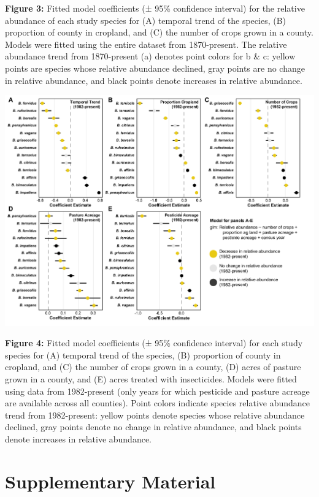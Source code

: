 \documentclass[11pt,]{article}
\begin{document}
\textbf{Figure 3:} Fitted model coefficients (± 95\% confidence
interval) for the relative abundance of each study species for (A)
temporal trend of the species, (B) proportion of county in cropland, and
(C) the number of crops grown in a county. Models were fitted using the
entire dataset from 1870-present. The relative abundance trend from
1870-present (a) denotes point colors for b \& c: yellow points are
species whose relative abundance declined, gray points are no change in
relative abundance, and black points denote increases in relative
abundance.

\clearpage

\newpage

\includegraphics[width=1\textwidth,height=\textheight]{../ms_figs/fig5.png}

\textbf{Figure 4:} Fitted model coefficients (± 95\% confidence
interval) for each study species for (A) temporal trend of the species,
(B) proportion of county in cropland, and (C) the number of crops grown
in a county, (D) acres of pasture grown in a county, and (E) acres
treated with insecticides. Models were fitted using data from
1982-present (only years for which pesticide and pasture acreage are
available across all counties). Point colors indicate species relative
abundance trend from 1982-present: yellow points denote species whose
relative abundance declined, gray points denote no change in relative
abundance, and black points denote increases in relative abundance.

\clearpage

\newpage

\hypertarget{supplementary-material}{%
\section{Supplementary Material}\label{supplementary-material}}
\end{document}
